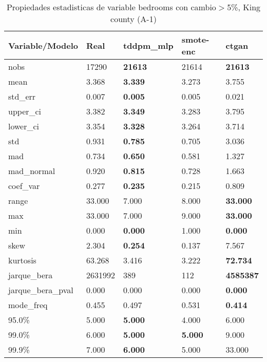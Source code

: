 \begin{table}[H]
\centering
\fontsize{8}{14}\selectfont
\caption{Propiedades estadisticas de variable bedrooms con cambio\ensuremath{>}5\%, King county (A-1)}
\label{table-stats-king county-a-1-bedrooms-short}
\begin{tabular}{|l|m{10em}|m{10em}|m{10em}|m{10em}|}
\hline
 \rowcolor[gray]{0.8}
Variable/Modelo & Real & tddpm\_mlp & smote-enc & ctgan \\
\hline nobs & 17290 & \bfseries 21613 & \cellcolor[rgb]{0.9, 0.54, 0.52} 21614 & \bfseries 21613 \\
\hline mean & 3.368 & \bfseries 3.339 & 3.273 & \cellcolor[rgb]{0.9, 0.54, 0.52} 3.755 \\
\hline std\_err & 0.007 & \bfseries 0.005 & 0.005 & \cellcolor[rgb]{0.9, 0.54, 0.52} 0.021 \\
\hline upper\_ci & 3.382 & \bfseries 3.349 & 3.283 & \cellcolor[rgb]{0.9, 0.54, 0.52} 3.795 \\
\hline lower\_ci & 3.354 & \bfseries 3.328 & 3.264 & \cellcolor[rgb]{0.9, 0.54, 0.52} 3.714 \\
\hline std & 0.931 & \bfseries 0.785 & 0.705 & \cellcolor[rgb]{0.9, 0.54, 0.52} 3.036 \\
\hline mad & 0.734 & \bfseries 0.650 & 0.581 & \cellcolor[rgb]{0.9, 0.54, 0.52} 1.327 \\
\hline mad\_normal & 0.920 & \bfseries 0.815 & 0.728 & \cellcolor[rgb]{0.9, 0.54, 0.52} 1.663 \\
\hline coef\_var & 0.277 & \bfseries 0.235 & 0.215 & \cellcolor[rgb]{0.9, 0.54, 0.52} 0.809 \\
\hline range & 33.000 & \cellcolor[rgb]{0.9, 0.54, 0.52} 7.000 & 8.000 & \bfseries 33.000 \\
\hline max & 33.000 & \cellcolor[rgb]{0.9, 0.54, 0.52} 7.000 & 9.000 & \bfseries 33.000 \\
\hline min & 0.000 & \bfseries 0.000 & \cellcolor[rgb]{0.9, 0.54, 0.52} 1.000 & \bfseries 0.000 \\
\hline skew & 2.304 & \bfseries 0.254 & 0.137 & \cellcolor[rgb]{0.9, 0.54, 0.52} 7.567 \\
\hline kurtosis & 63.268 & 3.416 & \cellcolor[rgb]{0.9, 0.54, 0.52} 3.222 & \bfseries 72.734 \\
\hline jarque\_bera & 2631992 & 389 & \cellcolor[rgb]{0.9, 0.54, 0.52} 112 & \bfseries 4585387 \\
\hline jarque\_bera\_pval & 0.000 & 0.000 & \cellcolor[rgb]{0.9, 0.54, 0.52} 0.000 & \bfseries 0.000 \\
\hline mode\_freq & 0.455 & 0.497 & \cellcolor[rgb]{0.9, 0.54, 0.52} 0.531 & \bfseries 0.414 \\
\hline 95.0\% & 5.000 & \bfseries 5.000 & \cellcolor[rgb]{0.9, 0.54, 0.52} 4.000 & \cellcolor[rgb]{0.9, 0.54, 0.52} 6.000 \\
\hline 99.0\% & 6.000 & \bfseries 5.000 & \bfseries 5.000 & \cellcolor[rgb]{0.9, 0.54, 0.52} 9.000 \\
\hline 99.9\% & 7.000 & \bfseries 6.000 & 5.000 & \cellcolor[rgb]{0.9, 0.54, 0.52} 33.000 \\
\hline
\end{tabular}
\end{table}
